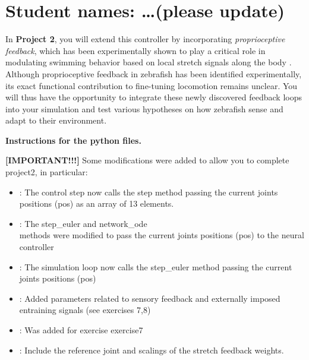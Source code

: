 \documentclass{cmc}
\begin{document}
\pagestyle{fancy}
 

\section*{Student names: \ldots (please update)}


In \textbf{Project 2}, you will extend this controller by incorporating \emph{proprioceptive feedback}, which has been experimentally shown to play a critical role in modulating swimming behavior based on local stretch signals along the body \cite{picton_spinal_2021}. Although proprioceptive feedback in zebrafish has been identified experimentally, its exact functional contribution to fine-tuning locomotion remains unclear. You will thus have the opportunity to integrate these newly discovered feedback loops into your simulation and test various hypotheses on how zebrafish sense and adapt to their environment.

\noindent
\textbf{Instructions for the python files. }

\textbf{[IMPORTANT!!!]} Some modifications were added to allow you to complete project2, in particular:
\begin{itemize}
\item {} : The control step now calls the step method passing the current joints positions (pos) as an array of 13 elements.
\item {} : The step\_euler and network\_ode \\ methods were modified to pass the current joints positions (pos) to the neural controller
\item {} : The simulation loop now calls the step\_euler method passing the current joints positions (pos)
\item {} : Added parameters related to sensory feedback and externally imposed entraining signals (see exercises 7,8)
\item {} : Was added for exercise exercise7
\item {} : Include the reference joint and scalings of the stretch feedback weights.
\end{itemize}
\end{document}

